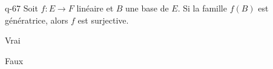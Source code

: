 \begin{truefalse}{q-67}
Soit $f : E \to F$ linéaire et $B$  une base de $E$. Si la famille $f(B)$ est génératrice, alors $f$ est surjective.
\item* Vrai
\item Faux
\end{truefalse}

